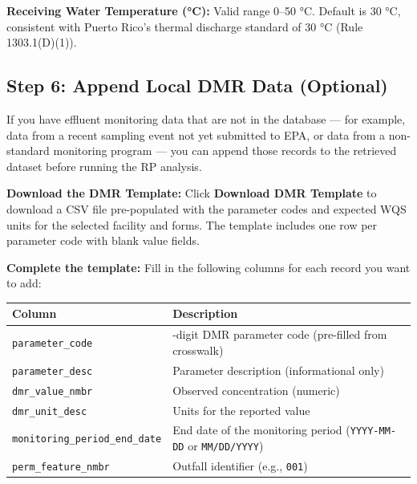 \documentclass[
  11pt,
  letterpaper,
  DIV=11,
  numbers=noendperiod]{scrartcl}
\newcounter{none} %
\begin{document}
\textbf{Receiving Water Temperature (°C):} Valid range 0--50 °C. Default
is 30 °C, consistent with Puerto Rico's thermal discharge standard of 30
°C (Rule 1303.1(D)(1)).

\subsection{Step 6: Append Local DMR Data
(Optional)}\label{sec-append-dmr}

If you have effluent monitoring data that are not in the database ---
for example, data from a recent sampling event not yet submitted to EPA,
or data from a non-standard monitoring program --- you can append those
records to the retrieved dataset before running the RP analysis.

\textbf{Download the DMR Template:} Click \textbf{Download DMR Template}
to download a CSV file pre-populated with the parameter codes and
expected WQS units for the selected facility and forms. The template
includes one row per parameter code with blank value fields.

\textbf{Complete the template:} Fill in the following columns for each
record you want to add:

{\def\LTcaptype{none} %
\begin{longtable}[]{@{}
  >{\raggedright\arraybackslash}p{}
  >{\raggedright\arraybackslash}p{}@{}}
\toprule\noalign{}
\begin{minipage}[b]{\linewidth}\raggedright
Column
\end{minipage} & \begin{minipage}[b]{\linewidth}\raggedright
Description
\end{minipage} \\
\midrule\noalign{}
\endhead
\bottomrule\noalign{}
\endlastfoot
\texttt{parameter\_code} & 5-digit DMR parameter code (pre-filled from
crosswalk) \\
\texttt{parameter\_desc} & Parameter description (informational only) \\
\texttt{dmr\_value\_nmbr} & Observed concentration (numeric) \\
\texttt{dmr\_unit\_desc} & Units for the reported value \\
\texttt{monitoring\_period\_end\_date} & End date of the monitoring
period (\texttt{YYYY-MM-DD} or \texttt{MM/DD/YYYY}) \\
\texttt{perm\_feature\_nmbr} & Outfall identifier (e.g.,
\texttt{001}) \\
\end{longtable}
}
\end{document}
